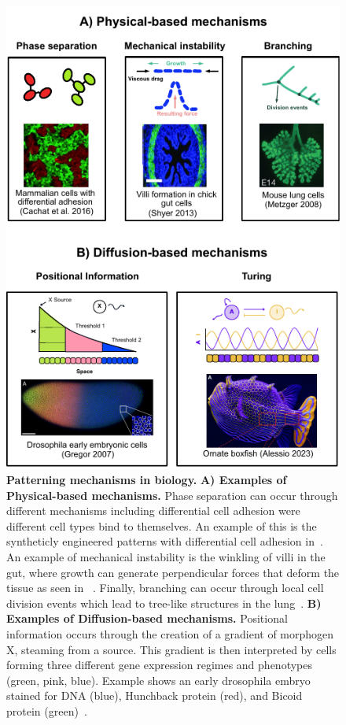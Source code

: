 \begin{figure}[H]
    \centering
    \includegraphics[width=1\textwidth]{chapters/Introduction/mechanisms_patterning}
    \caption{\textbf{Patterning mechanisms in biology.} \textbf{A) Examples of Physical-based mechanisms.}
    Phase separation can occur through different mechanisms including differential cell adhesion were different cell types bind to themselves. An example of this is the syntheticly engineered patterns with differential cell adhesion in~\cite{cachat20162}.
    An example of mechanical instability is the winkling of villi in the gut, where growth can generate perpendicular forces that deform the tissue as seen in ~\cite{shyer2013villification}.
    Finally, branching can occur through local cell division events which lead to tree-like structures in the lung~\parencite{metzger2008branching}.  \textbf{B) Examples of Diffusion-based mechanisms.}
    Positional information occurs through the creation of a gradient of morphogen X, steaming from a source. This gradient is then interpreted by cells forming three different gene expression regimes and phenotypes (green, pink, blue).
    Example shows an early drosophila embryo stained for DNA (blue), Hunchback protein (red), and Bicoid protein (green)~\parencite{gregor2007probing}.}
    \label{fig:mechanisms_patterning}
\end{figure}


